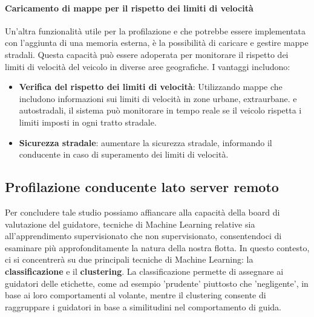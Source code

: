 \documentclass[12pt, a4paper, italian]{report}
\numberwithin{figure}{chapter}
\numberwithin{table}{chapter}
\begin{document}
\paragraph{Caricamento di mappe per il rispetto dei limiti di velocità} 
Un'altra funzionalità utile per la profilazione e che potrebbe essere implementata con l'aggiunta di una memoria esterna, è la possibilità di caricare e gestire mappe stradali. Questa capacità può essere adoperata per monitorare il rispetto dei limiti di velocità del veicolo in diverse aree geografiche. I vantaggi includono:

\begin{itemize}
    \item \textbf{Verifica del rispetto dei limiti di velocità}: Utilizzando mappe che includono informazioni sui limiti di velocità in zone urbane, extraurbane. e autostradali, il sistema può monitorare in tempo reale se il veicolo rispetta i limiti imposti in ogni tratto stradale.
    \item \textbf{Sicurezza stradale}: aumentare la sicurezza stradale, informando il conducente in caso di superamento dei limiti di velocità. 
\end{itemize}

\subsection{Profilazione conducente lato server remoto} %
Per concludere tale studio possiamo affiancare alla capacità della board di valutazione del guidatore, tecniche di Machine Learning relative sia all'apprendimento supervisionato che non supervisionato, consentendoci di esaminare più approfonditamente la natura della nostra flotta. In questo contesto, ci si concentrerà su due principali tecniche di Machine Learning: la \textbf{classificazione} e il \textbf{clustering}. La classificazione permette di assegnare ai guidatori delle etichette, come ad esempio 'prudente' piuttosto che 'negligente', in base ai loro comportamenti al volante, mentre il clustering consente di raggruppare i guidatori in base a similitudini nel comportamento di guida. \cite{wiki:Apprendimento_automatico}
\end{document}
